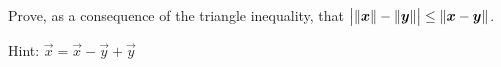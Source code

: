 
\begin{Exercise}[
name={},
title={}, 
difficulty=0,
origin={\cite{SM}}]
Prove, as a consequence of the triangle inequality, that $\big|\lVert\bm{x}\rVert-\lVert\bm{y}\rVert\big|\leq\lVert\bm{x}-\bm{y}\rVert$.
\end{Exercise}

\begin{Answer}
Hint: $\vec{x} = \vec{x}-\vec{y}+\vec{y}$
\end{Answer}
